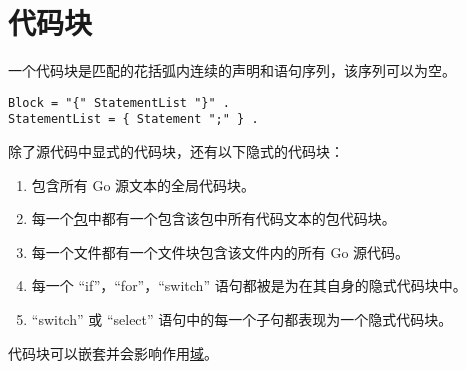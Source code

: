\chapter{代码块} \label{ch:blocks}
一个代码块是匹配的花括弧内连续的声明和语句序列，该序列可以为空。
\begin{lstlisting}[style=EBNF]
Block = "{" StatementList "}" .
StatementList = { Statement ";" } .
\end{lstlisting}

除了源代码中显式的代码块，还有以下隐式的代码块：
\begin{enumerate}
\item 包含所有 Go 源文本的全局代码块。
\item 每一个\hyperref[ch:blocks]{包}中都有一个包含该包中所有代码文本的包代码块。
\item 每一个文件都有一个文件块包含该文件内的所有 Go 源代码。
\item 每一个 ``if''，``for''，``switch'' 语句都被是为在其自身的隐式代码块中。
\item  ``switch'' 或 ``select'' 语句中的每一个子句都表现为一个隐式代码块。
\end{enumerate}
代码块可以嵌套并会影响作用\hyperref[ch:declarations and scope]{域}。